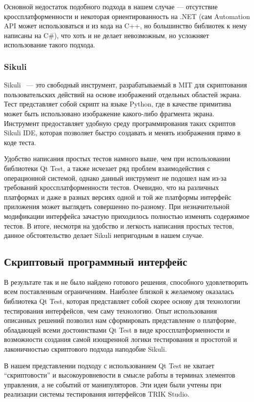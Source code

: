 \documentclass[conference]{IEEEtran}
\begin{document}
Основной недостаток подобного подхода в нашем случае --- отсутствие кроссплатформенности и некоторая ориентированность 
на .NET (сам Automation API может использоваться и из кода на C++, но большинство библиотек к нему написаны на C\#), 
что хоть и не делает невозможным, но усложняет использование такого подхода.

\subsubsection{Sikuli}
Sikuli~\cite{yen2009sikuli} --- это свободный инструмент, разрабатываемый в MIT для скриптования пользовательских действий на 
основе изображений отдельных областей экрана. Тест представляет собой скрипт на языке Python, где в качестве 
примитива может быть использовано изображение какого-либо фрагмента экрана. Инструмент предоставляет удобную 
среду программирования таких скриптов Sikuli IDE, которая позволяет быстро создавать и менять изображения прямо в коде теста.

Удобство написания простых тестов намного выше, чем при использовании библиотеки Qt Test, а также исчезает 
ряд проблем взаимодействия с операционной системой, однако данный инструмент не подошел нам из-за требований 
кроссплатформенности тестов. Очевидно, что на различных платформах и даже в разных версиях одной и той же 
платформы интерфейс приложения может выглядеть совершенно по-разному. При незначительной модификации интерфейса 
зачастую приходилось полностью изменять содержимое тестов. В итоге, несмотря на удобство и легкость написания 
простых тестов, данное обстоятельство делает Sikuli непригодным в нашем случае.

\subsection{Скриптовый программный интерфейс}
\label{part:scriptApi}
В результате так и не было найдено готового решения, способного удовлетворить всем поставленным ограничениям. 
Наиболее близкой к желаемому оказалась библиотека Qt Test, которая представляет собой скорее основу для
технологии тестирования интерфейсов, чем саму технологию. Опыт использования описанных решений позволил 
нам сформировать представление о платформе, обладающей всеми достоинствами Qt Test в виде кроссплатформенности 
и возможности создания самой изощренной логики тестирования и простотой и лаконичностью скриптового подхода наподобие Sikuli.

В нашем представлении подходу с использованием Qt Test не хватает "`скриптовости"' и высокоуровневости 
в смысле работы в терминах элементов управления, а не событий от манипуляторов. Эти идеи были учтены при 
реализации системы тестирования интерфейсов TRIK Studio.
\end{document}
